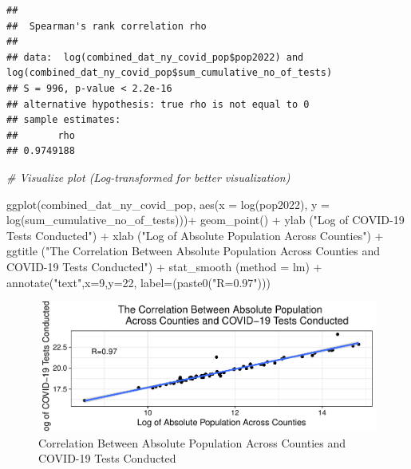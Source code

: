 \documentclass[
  12pt,
]{article}
\newenvironment{Shaded}{\begin{snugshade}}{\end{snugshade}}
\newcommand{\AttributeTok}[1]{\textcolor[rgb]{0.77,0.63,0.00}{#1}}
\newcommand{\CommentTok}[1]{\textcolor[rgb]{0.56,0.35,0.01}{\textit{#1}}}
\newcommand{\DecValTok}[1]{\textcolor[rgb]{0.00,0.00,0.81}{#1}}
\newcommand{\FunctionTok}[1]{\textcolor[rgb]{0.00,0.00,0.00}{#1}}
\newcommand{\NormalTok}[1]{#1}
\newcommand{\SpecialCharTok}[1]{\textcolor[rgb]{0.00,0.00,0.00}{#1}}
\newcommand{\StringTok}[1]{\textcolor[rgb]{0.31,0.60,0.02}{#1}}
\begin{document}
\begin{verbatim}
## 
##  Spearman's rank correlation rho
## 
## data:  log(combined_dat_ny_covid_pop$pop2022) and log(combined_dat_ny_covid_pop$sum_cumulative_no_of_tests)
## S = 996, p-value < 2.2e-16
## alternative hypothesis: true rho is not equal to 0
## sample estimates:
##       rho 
## 0.9749188
\end{verbatim}

\begin{Shaded}
\begin{Highlighting}[]
\CommentTok{\# Visualize plot (Log{-}transformed for better visualization)}

\FunctionTok{ggplot}\NormalTok{(combined\_dat\_ny\_covid\_pop,}
       \FunctionTok{aes}\NormalTok{(}\AttributeTok{x =} \FunctionTok{log}\NormalTok{(pop2022),}
           \AttributeTok{y =} \FunctionTok{log}\NormalTok{(sum\_cumulative\_no\_of\_tests)))}\SpecialCharTok{+}
  \FunctionTok{geom\_point}\NormalTok{() }\SpecialCharTok{+}
  \FunctionTok{ylab}\NormalTok{ (}\StringTok{"Log of COVID{-}19 Tests Conducted"}\NormalTok{) }\SpecialCharTok{+}
  \FunctionTok{xlab}\NormalTok{ (}\StringTok{"Log of Absolute Population Across Counties"}\NormalTok{) }\SpecialCharTok{+}
  \FunctionTok{ggtitle}\NormalTok{ (}\StringTok{"The Correlation Between Absolute Population }
\StringTok{           Across Counties and COVID{-}19 Tests Conducted"}\NormalTok{) }\SpecialCharTok{+}
  \FunctionTok{stat\_smooth}\NormalTok{ (}\AttributeTok{method =} \StringTok{\textquotesingle{}lm\textquotesingle{}}\NormalTok{) }\SpecialCharTok{+}
  \FunctionTok{annotate}\NormalTok{(}\StringTok{"text"}\NormalTok{,}\AttributeTok{x=}\DecValTok{9}\NormalTok{,}\AttributeTok{y=}\DecValTok{22}\NormalTok{, }\AttributeTok{label=}\NormalTok{(}\FunctionTok{paste0}\NormalTok{(}\StringTok{"R=0.97"}\NormalTok{)))}
\end{Highlighting}
\end{Shaded}

\begin{figure}

\includegraphics{EDA_Final_Group_Project_files/figure-latex/unnamed-chunk-26-1} \hfill{}

\caption{Correlation Between Absolute Population Across Counties and COVID-19 Tests Conducted}\label{fig:unnamed-chunk-26}
\end{figure}
\end{document}
